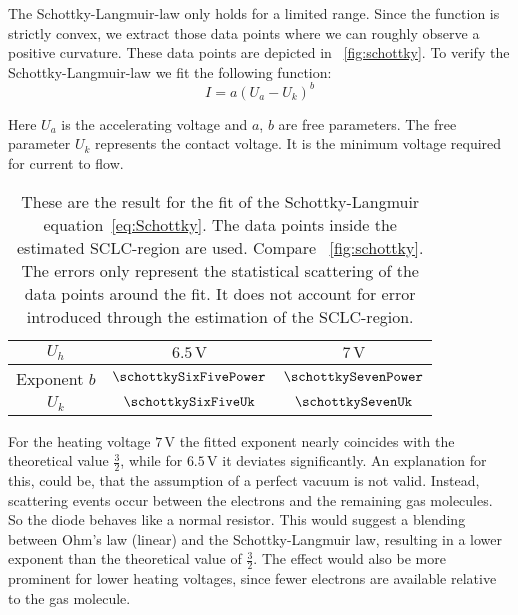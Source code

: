 \documentclass[a4paper,10pt,twocolumn]{article}
\newcommand{\volt}{\, \mathrm{V}}
\newcommand{\sixfiveV}{6.5 \volt}
\newcommand{\sevenV}{7 \volt}
\begin{document}
    The Schottky-Langmuir-law only holds for a limited range.
    Since the function is strictly convex, we extract those data points where we can roughly observe a 
    positive curvature.
    These data points are depicted in ~\autoref{fig:schottky}.
    To verify the Schottky-Langmuir-law we fit the following function:
    \begin{equation}
        \label{eq:Schottky}
        I = a (U_a - U_k)^{b}
    \end{equation}
    
    Here $U_a$ is the accelerating voltage and $a$, $b$ are free parameters.
    The free parameter $U_k$ represents the contact voltage.
    It is the minimum voltage required for current to flow.
    
    \begin{table}[h!]
        \centering
        \begin{tabular}{c c c}
            \hline \hline 
            $U_h$ & $\sixfiveV$ & $\sevenV$ \\
            \hline 
            Exponent $b$ & $\schottkySixFivePower$ & $\schottkySevenPower$ \\
            $U_k$ & $\schottkySixFiveUk$ & $\schottkySevenUk$ \\
            \hline \hline
        \end{tabular}
        \caption{These are the result for the fit of the Schottky-Langmuir equation~\eqref{eq:Schottky}.
        The data points inside the estimated SCLC-region are used.
        Compare ~\autoref{fig:schottky}.
        The errors only represent the statistical scattering of the data points around the fit.
        It does not account for error introduced through the estimation of the SCLC-region.}
        \label{tab:schottkyFit}
    \end{table}
    
    For the heating voltage $\sevenV$ the fitted exponent nearly coincides with the theoretical value $\frac{3}{2}$, while
    for $\sixfiveV$ it deviates significantly.
    An explanation for this, could be, that the assumption of a perfect vacuum is not valid.
    Instead, scattering events occur between the electrons and the remaining gas molecules.
    So the diode behaves like a normal resistor.
    This would suggest a blending between Ohm's law (linear) and the Schottky-Langmuir law, resulting in a lower
    exponent than the theoretical value of $\frac{3}{2}$.
    The effect would also be more prominent for lower heating voltages, since fewer electrons are available relative to
    the gas molecule.
    
\end{document}
